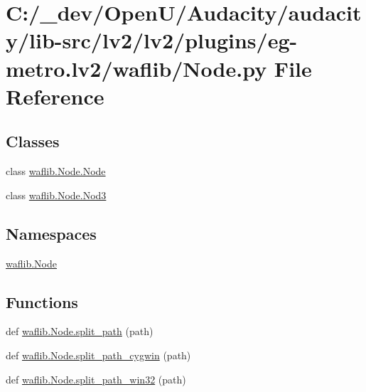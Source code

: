 \hypertarget{lv2_2plugins_2eg-metro_8lv2_2waflib_2_node_8py}{}\section{C\+:/\+\_\+dev/\+Open\+U/\+Audacity/audacity/lib-\/src/lv2/lv2/plugins/eg-\/metro.lv2/waflib/\+Node.py File Reference}
\label{lv2_2plugins_2eg-metro_8lv2_2waflib_2_node_8py}
\subsection*{Classes}
\begin{DoxyCompactItemize}
\item 
class \hyperlink{classwaflib_1_1_node_1_1_node}{waflib.\+Node.\+Node}
\item 
class \hyperlink{classwaflib_1_1_node_1_1_nod3}{waflib.\+Node.\+Nod3}
\end{DoxyCompactItemize}
\subsection*{Namespaces}
\begin{DoxyCompactItemize}
\item 
 \hyperlink{namespacewaflib_1_1_node}{waflib.\+Node}
\end{DoxyCompactItemize}
\subsection*{Functions}
\begin{DoxyCompactItemize}
\item 
def \hyperlink{namespacewaflib_1_1_node_ae580a314d04691a283552a4712b56a84}{waflib.\+Node.\+split\+\_\+path} (path)
\item 
def \hyperlink{namespacewaflib_1_1_node_a089fc378e3863231aab10b6892a9bc2b}{waflib.\+Node.\+split\+\_\+path\+\_\+cygwin} (path)
\item 
def \hyperlink{namespacewaflib_1_1_node_a20acd7540bbb7886232accfe0a2a4219}{waflib.\+Node.\+split\+\_\+path\+\_\+win32} (path)
\end{DoxyCompactItemize}
